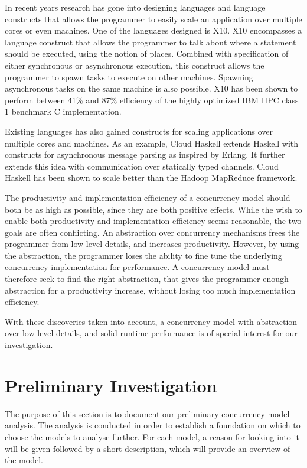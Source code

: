 In recent years research has gone into designing languages and language constructs that allows the programmer to easily scale an application over multiple cores or even machines. One of the languages designed is X10\cite{charles2005x10}. X10 encompasses a language construct that allows the programmer to talk about where a statement should be executed, using the notion of places\cite[p. 54]{tardieu2014x10}. Combined with specification of either synchronous or asynchronous execution, this construct allows the programmer to spawn tasks to execute on other machines. Spawning asynchronous tasks on the same machine is also possible\cite[p. 55]{tardieu2014x10}. X10 has been shown to perform between 41\% and 87\% efficiency of the highly optimized IBM HPC class 1 benchmark C implementation\cite[p. 62]{tardieu2014x10}.

Existing languages has also gained constructs for scaling applications over multiple cores and machines.  As an example, Cloud Haskell extends Haskell with constructs for asynchronous message parsing as inspired by Erlang\cite[p. 119]{epstein2011towards}. It further extends this idea with communication over statically typed channels\cite[p. 122]{epstein2011towards}. Cloud Haskell has been shown to scale better than the Hadoop MapReduce framework\cite[p. 128]{epstein2011towards}.

The productivity and implementation efficiency of a concurrency model should both be as high as possible, since they are both positive effects. While the wish to enable both productivity and implementation efficiency seems reasonable, the two goals are often conflicting. An abstraction over concurrency mechanisms frees the programmer from low level details, and increases productivity. However, by using the abstraction, the programmer loses the ability to fine tune the underlying concurrency implementation for performance. A concurrency model must therefore seek to find the right abstraction, that gives the programmer enough abstraction for a productivity increase, without losing too much implementation efficiency.

With these discoveries taken into account, a concurrency model with abstraction over low level details, and solid runtime performance is of special interest for our investigation.

\section{Preliminary Investigation}\label{sec:prelim}
The purpose of this section is to document our preliminary concurrency model analysis. The analysis is conducted in order to establish a foundation on which to choose the models to analyse further. For each model, a reason for looking into it will be given followed by a short description, which will provide an overview of the model.

